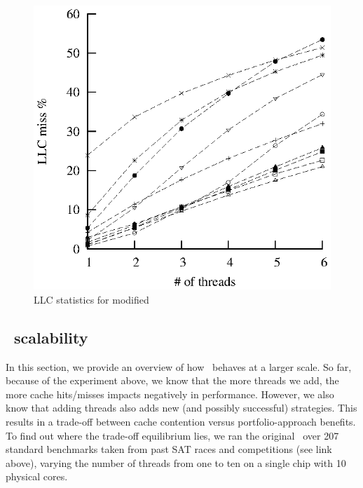 \begin{figure}[h]
  \centering
  \includegraphics{plingeling_decay_cache}
  \caption{LLC statistics for modified \pling}
  \label{fig:LLCStats}  
\end{figure}

\subsection{\pling\ scalability}

In this section, we provide an overview of how \pling\ behaves at a
larger scale. So far, because of the experiment above, we know that
the more threads we add, the more cache hits/misses impacts negatively
in performance. However, we also know that adding threads also adds
new (and possibly successful) strategies. This results in a trade-off
between cache contention versus portfolio-approach benefits. To find
out where the trade-off equilibrium lies, we ran the original \pling\
over 207 standard benchmarks taken from past SAT races and
competitions (see link above), varying the number of threads from one
to ten on a single chip with 10 physical cores.

